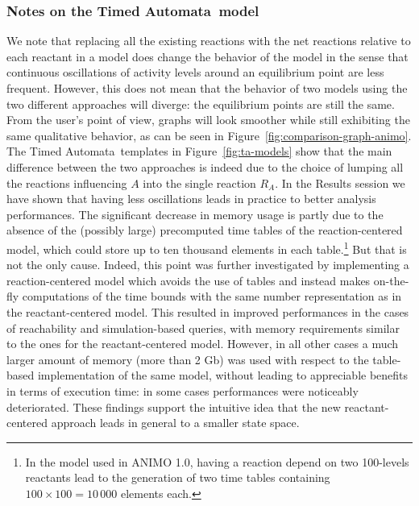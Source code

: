 \documentclass{bmcart}
\def\tas{Timed Automata}
\begin{document}
\subsubsection*{Notes on the \tas\ model}\label{sec:ta-notes}
We note that replacing all the existing reactions with the net reactions relative to each
reactant in a model does change the behavior of the model in the sense that continuous oscillations
of activity levels around an equilibrium point are less frequent. However, this does not mean that the
behavior of two models using the two different approaches will diverge: the equilibrium points
are still the same.
From the user's point of view, graphs will look smoother while still exhibiting the same qualitative behavior,
as can be seen in Figure~\ref{fig:comparison-graph-animo}.
The \tas\ templates in Figure~\ref{fig:ta-models} show that the main difference between the two approaches
is indeed due to the choice of lumping all the reactions influencing $A$ into the single
reaction $R_A$.
In the Results session we have shown that having less oscillations leads in practice to better analysis performances.
The significant decrease in memory usage is partly due to the absence of the (possibly large) precomputed time tables
of the reaction-centered model, which could store up to ten thousand elements in each table.\footnote{In the model used in ANIMO 1.0, having a reaction depend on two 100-levels reactants
lead to the generation of two time tables containing $100 \times 100 = 10\,{}000$ elements each.} But that is not the only cause.
Indeed, this point was further investigated by implementing a reaction-centered model which
avoids the use of tables and instead makes on-the-fly computations of the time bounds with the same number representation as in the reactant-centered model.
This resulted in improved performances in the cases of reachability and simulation-based queries, with memory requirements similar to the ones for
the reactant-centered model. However, in all other cases a much larger amount of memory (more than 2 Gb) was used
with respect to the table-based implementation of the same model, without leading to appreciable benefits in terms of execution time:
in some cases performances were noticeably deteriorated. These findings support the intuitive idea that the new reactant-centered approach
leads in general to a smaller state space.
\end{document}
